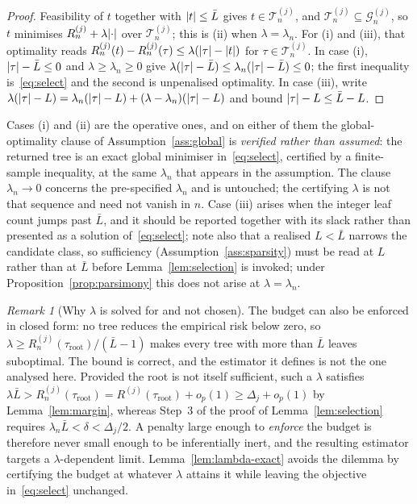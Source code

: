 \documentclass[11pt]{article}
\theoremstyle{plain}
\theoremstyle{definition}
\theoremstyle{remark}
\newtheorem{remark}[theorem]{Remark}
\newcommand{\cT}{\mathcal{T}}
\newcommand{\cG}{\mathcal{G}}
\DeclarePairedDelimiter{\card}{\lvert}{\rvert}
\begin{document}
\begin{proof}
Feasibility of $t$ together with $\card t\le\bar L$ gives $t\in\cT^{(j)}_n$, and
$\cT^{(j)}_n\subseteq\cG^{(j)}_n$, so $t$ minimises
$R^{(j)}_n+\lambda\card{\cdot}$ over $\cT^{(j)}_n$; this is (ii) when
$\lambda=\lambda_n$. For (i) and (iii), that optimality reads
$R^{(j)}_n(t)-R^{(j)}_n(\tau)\le\lambda(\card\tau-\card t)$ for
$\tau\in\cT^{(j)}_n$. In case (i), $\card\tau-\bar L\le0$ and
$\lambda\ge\lambda_n\ge0$ give
$\lambda(\card\tau-\bar L)\le\lambda_n(\card\tau-\bar L)\le0$; the first
inequality is~\eqref{eq:select} and the second is unpenalised optimality. In
case (iii), write
$\lambda(\card\tau-L)=\lambda_n(\card\tau-L)+(\lambda-\lambda_n)(\card\tau-L)$
and bound $\card\tau-L\le\bar L-L$.
\end{proof}

\noindent Cases (i) and (ii) are the operative ones, and on either of them the
global-optimality clause of Assumption~\ref{ass:global} is \emph{verified rather
than assumed}: the returned tree is an exact global minimiser
in~\eqref{eq:select}, certified by a finite-sample inequality, at the same
$\lambda_n$ that appears in the assumption. The clause $\lambda_n\to0$ concerns
the pre-specified $\lambda_n$ and is untouched; the certifying $\lambda$ is not
that sequence and need not vanish in $n$. Case (iii) arises when the integer
leaf count jumps past $\bar L$, and it should be reported together with its
slack rather than presented as a solution of~\eqref{eq:select}; note also that a
realised $L<\bar L$ narrows the candidate class, so sufficiency
(Assumption~\ref{ass:sparsity}) must be read at $L$ rather than at $\bar L$
before Lemma~\ref{lem:selection} is invoked; under
Proposition~\ref{prop:parsimony} this does not arise at $\lambda=\lambda_n$.

\begin{remark}[Why $\lambda$ is solved for and not chosen]\label{rem:lambda-closed-form}
The budget can also be enforced in closed form: no tree reduces the empirical
risk below zero, so $\lambda\ge R^{(j)}_n(\tau_{\mathrm{root}})/(\bar L-1)$
makes every tree with more than $\bar L$ leaves suboptimal. The bound is
correct, and the estimator it defines is not the one analysed here. Provided the
root is not itself sufficient, such a $\lambda$ satisfies
$\lambda\bar L>R^{(j)}_n(\tau_{\mathrm{root}})
=R^{(j)}(\tau_{\mathrm{root}})+o_p(1)\ge\Delta_j+o_p(1)$ by
Lemma~\ref{lem:margin}, whereas Step~3 of the proof of
Lemma~\ref{lem:selection} requires $\lambda_n\bar L<\delta<\Delta_j/2$. A
penalty large enough to \emph{enforce} the budget is therefore never small
enough to be inferentially inert, and the resulting estimator targets a
$\lambda$-dependent limit. Lemma~\ref{lem:lambda-exact} avoids the dilemma by
certifying the budget at whatever $\lambda$ attains it while leaving the
objective in~\eqref{eq:select} unchanged.
\end{remark}
\end{document}

